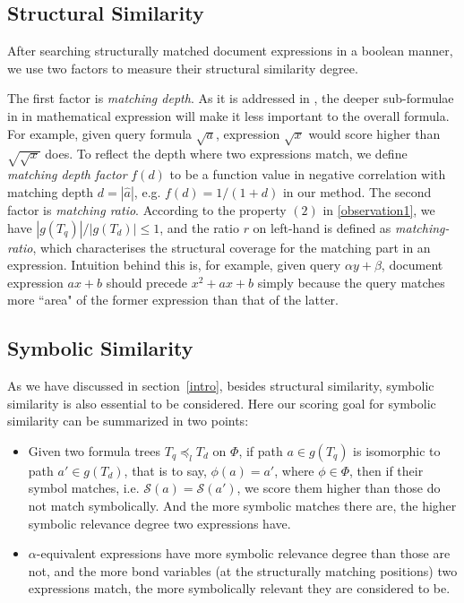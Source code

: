 \documentclass{acm_proc_article-sp}
\begin{document}
\subsection{Structural Similarity}
After searching structurally matched document expressions in a boolean manner, we use two factors to measure their structural similarity degree. 

The first factor is \textit{matching depth}.
As it is addressed in \cite{mias11a}, the deeper sub-formulae in in mathematical expression will make it less important to the overall formula.
For example, given query formula $\sqrt a$, expression $\sqrt {x}$ would score higher than $\sqrt{\sqrt{x}}$ does. 
To reflect the depth where two expressions match, we define \textit{matching depth factor} $f(d)$ to be a function value in negative correlation with matching depth $d = |\hat{a}|$, e.g. $f(d) = 1/(1 + d)$ in our method.
The second factor is \textit{matching ratio}. According to the property $(2)$ in \ref{observation1}, 
we have $|g(T_q)| / |g(T_d)| \le 1$, and the ratio $r$ on left-hand is defined as \textit{matching-ratio}, which characterises the structural coverage for the matching part in an expression.
Intuition behind this is, for example, given query $\alpha y + \beta$, document expression $ax + b$ should precede $x^2 + ax + b$ simply because the query matches more ``area" of the former expression than that of the latter.

\subsection{Symbolic Similarity}
As we have discussed in section~\ref{intro}, besides structural similarity, symbolic similarity is also essential to be considered.
Here our scoring goal for symbolic similarity can be summarized in two points:
\begin{itemize}
\item Given two formula trees
$T_q \preceq_l T_d$ on $\Phi$,  
if path $a \in g(T_q)$ is isomorphic to path $a' \in g(T_d)$, that is to say, $\phi(a)=a'$, where $\phi \in \Phi$, then if their symbol matches, i.e. $\mathcal{S}(a) = \mathcal{S}(a')$, we score them higher than those do not match symbolically. And the more symbolic matches there are, the higher symbolic relevance degree two expressions have.
\item $\alpha$-equivalent expressions have more symbolic relevance degree than those are not, and the more bond variables (at the structurally matching positions) two expressions match, the more symbolically relevant they are considered to be.
\end{itemize}
\end{document}
